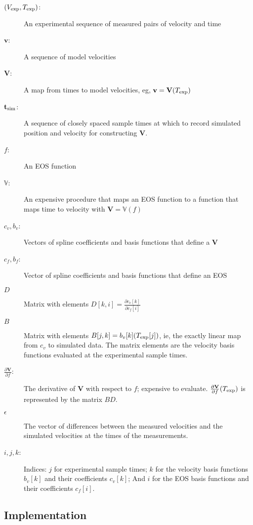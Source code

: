 \documentclass[11pt]{article}
\newcommand{\partiald}[2]{\frac{\partial #1}{\partial #2}}
\newcommand\bv{\mathbf{v}}
\newcommand\Vfunc{\mathbb{V}}
\newcommand\Vt{\mathbf{V}}
\newcommand\vexp{V_{\rm{exp}}}
\newcommand\texp{T_{\rm{exp}}}
\newcommand\cf{c_f}
\newcommand\cv{c_v}
\newcommand\fbasis{b_f}
\newcommand\vbasis{b_v}
\newcommand\tsim{{\mathbf t}_{\rm{sim}}}
\newcommand\DVDf{\partiald{\Vt}{f}}
\begin{document}
\begin{description}
\item[$(\vexp, \texp)$:] An experimental sequence of measured pairs of
  velocity and time
\item[$\bv$:] A sequence of model velocities
\item[$\Vt$:] A map from times to model velocities, eg, $\bv =
  \Vt(\texp)$
\item[$\tsim$:] A sequence of closely spaced sample times at which to record
  simulated position and velocity for constructing $\Vt$.
\item[$f$:] An EOS function
\item[$\Vfunc$:] An expensive procedure that maps an EOS function to a
  function that maps time to velocity with $\Vt = \Vfunc(f)$
\item[$\cv,\vbasis$:] Vectors of spline coefficients and basis functions
  that define a $\Vt$
\item[$\cf,\fbasis$:] Vector of spline coefficients and basis functions
  that define an EOS
\item[$D$] Matrix with elements $D[k,i] = \partiald{\cv[k]}{\cf[i]}$
\item[$B$] Matrix with elements $B[j,k] = \vbasis[k](\texp[j])$, ie,
  the exactly linear map from $c_v$ to simulated data.  The matrix
  elements are the velocity basis functions evaluated at the
  experimental sample times.
\item[$\DVDf$:] The derivative of $\Vt$ with respect to $f$; expensive
  to evaluate.  $\DVDf (\texp)$ is represented by the matrix $BD$.
\item[$\epsilon$] The vector of differences between the measured
  velocities and the simulated velocities at the times of the
  measurements.
\item[$i,j,k$:] Indices: $j$ for experimental sample times; $k$ for
  the velocity basis functions $\vbasis[k]$ and their coefficients
  $\cv[k]$; And $i$ for the EOS basis functions and their coefficients
  $\cf[i]$.
\end{description}

\subsection{Implementation}
\label{sec:basic_implementation}
\end{document}
